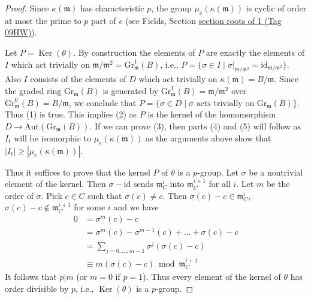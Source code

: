 \documentclass{amsart}
\theoremstyle{plain}
\theoremstyle{definition}
\theoremstyle{remark}
\numberwithin{equation}{subsection}
\def\Ker{\mathop{\mathrm{Ker}}}
\begin{document}
\begin{proof}
\medskip\noindent
Since $\kappa(\mathfrak m)$ has characteristic $p$, the group
$\mu_e(\kappa(\mathfrak m))$ is cyclic of order at most the prime
to $p$ part of $e$ (see Fields, Section \href{https://stacks.math.columbia.edu/tag/09HW}{section roots of 1 (Tag 09HW)}).

\medskip\noindent
Let $P = \Ker(\theta)$. By construction the elements of $P$ are exactly
the elements of $I$ which act trivially on
$\mathfrak m/\mathfrak m^2 = \text{Gr}_\mathfrak m^1(B)$,
i.e., $P = \{\sigma \in I \mid \sigma|_{\mathfrak m/\mathfrak m^2} =
\text{id}_{\mathfrak m/\mathfrak m^2}\}$. Also
$I$ consists of the elements of $D$ which act trivially on
$\kappa(\mathfrak m) = B/\mathfrak m$.
Since the graded ring $\text{Gr}_\mathfrak m(B)$ is generated
by $\text{Gr}^1_\mathfrak m(B) = \mathfrak m/\mathfrak m^2$ over
$\text{Gr}^0_\mathfrak m(B) = B/\mathfrak m$, we conclude that
$P = \{\sigma \in D \mid \sigma \text{ acts trivially on }
\text{Gr}_\mathfrak m(B)\}$.
Thus (1) is true. This implies (2) as $P$ is the kernel
of the homomorphism $D \to \text{Aut}(\text{Gr}_\mathfrak m(B))$.
If we can prove (3), then parts (4) and (5) will follow as $I_t$
will be isomorphic to $\mu_e(\kappa(\mathfrak m))$ as the arguments above show
that $|I_t| \geq |\mu_e(\kappa(\mathfrak m))|$.

\medskip\noindent
Thus it suffices to prove that the
kernel $P$ of $\theta$ is a $p$-group.
Let $\sigma$ be a nontrivial element of the kernel. Then $\sigma - \text{id}$
sends $\mathfrak m_C^i$ into $\mathfrak m_C^{i + 1}$
for all $i$. Let $m$ be the order of $\sigma$. Pick $c \in C$ such
that $\sigma(c) \not = c$. Then $\sigma(c) - c \in \mathfrak m_C^i$,
$\sigma(c) - c \not \in \mathfrak m_C^{i + 1}$ for some $i$ and
we have
\begin{align*}
0
& =
\sigma^m(c) - c \\
& =
\sigma^m(c) - \sigma^{m - 1}(c) + \ldots + \sigma(c) - c \\
& =
\sum\nolimits_{j = 0, \ldots, m - 1} \sigma^j(\sigma(c) - c) \\
& \equiv
m(\sigma(c) - c) \bmod \mathfrak m_C^{i + 1}
\end{align*}
It follows that $p | m$ (or $m = 0$ if $p = 1$). Thus every element of the
kernel of $\theta$ has order divisible by $p$, i.e., $\Ker(\theta)$
is a $p$-group.


\end{proof}
\end{document}
